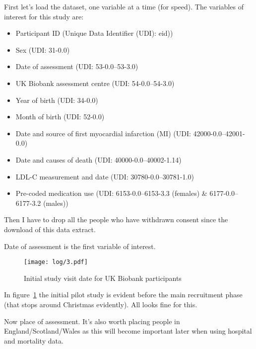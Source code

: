 \documentclass[11pt]{article}
\begin{document}
First let's load the dataset, one variable at a time (for speed).
The variables of interest for this study are:
\begin{itemize}
\item Participant ID (Unique Data Identifier (UDI): eid))
\item Sex (UDI: 31-0.0)
\item Date of assessment (UDI: 53-0.0--53-3.0)
\item UK Biobank assessment centre (UDI: 54-0.0--54-3.0)
\item Year of birth (UDI: 34-0.0)
\item Month of birth (UDI: 52-0.0)
\item Date and source of first myocardial infarction (MI) (UDI: 42000-0.0--42001-0.0)
\item Date and causes of death (UDI: 40000-0.0--40002-1.14)
\item LDL-C measurement and date (UDI: 30780-0.0--30781-1.0)
\item Pre-coded medication use (UDI: 6153-0.0--6153-3.3 (females) \& 6177-0.0--6177-3.2 (males))
\end{itemize}

Then I have to drop all the people who have withdrawn consent since the download of this 
data extract. 

\color{Blue4}
\begin{stlog}\end{stlog}
\begin{stlog}\end{stlog}
\color{black}
Date of assessment is the first variable of interest.
\color{Blue4}
\begin{figure}
    \centering
    \texttt{[image: log/3.pdf]}
    \caption{Initial study visit date for UK Biobank participants}
    \label{DAhist}
\end{figure}
\begin{stlog}\end{stlog}
\color{black}

In figure~\ref{DAhist} the initial pilot study is evident before the main recruitment phase (that stops around Christmas evidently). 
All looks fine for this. 

Now place of assessment. It's also worth placing people in England/Scotland/Wales as this will become important later when using 
hospital and mortality data.

\color{Blue4}
\begin{stlog}\end{stlog}
\color{black}
\end{document}

